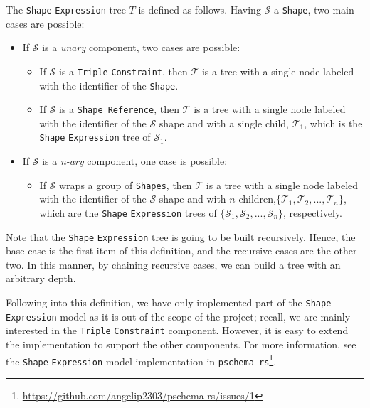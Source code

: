 \begin{definition}
    The \texttt{Shape} \texttt{Expression} tree $T$ is defined as follows. Having $\mathcal{S}$ a \texttt{Shape}, two main cases are possible:

    \begin{itemize}
        \itemsep0.5em
        \item If $\mathcal{S}$ is a \textit{unary} component, two cases are possible:
              \begin{itemize}
                  \itemsep0.25em
                  \item If $\mathcal{S}$ is a \texttt{Triple} \texttt{Constraint}, then $\mathcal{T}$ is a tree with a single node labeled with the identifier of the \texttt{Shape}.
                  \item If $\mathcal{S}$ is a \texttt{Shape Reference}, then $\mathcal{T}$ is a tree with a single node labeled with the identifier of the $\mathcal{S}$ shape and with a single child, $\mathcal{T}_1$, which is the \texttt{Shape} \texttt{Expression} tree of $\mathcal{S}_1$.
              \end{itemize}
        \item If $\mathcal{S}$ is a \textit{n-ary} component, one case is possible:
              \begin{itemize}
                  \itemsep0.25em
                  \item If $\mathcal{S}$ wraps a group of \texttt{Shapes}, then $\mathcal{T}$ is a tree with a single node labeled with the identifier of the $\mathcal{S}$ shape and with $n$ children,$\{\mathcal{T}_1, \mathcal{T}_2, ..., \mathcal{T}_n\}$, which are the \texttt{Shape} \texttt{Expression} trees of $\{\mathcal{S}_1, \mathcal{S}_2, ..., \mathcal{S}_n\}$, respectively.
              \end{itemize}
    \end{itemize}

    Note that the \texttt{Shape} \texttt{Expression} tree is going to be built recursively. Hence, the base case is the first item of this definition, and the recursive cases are the other two. In this manner, by chaining recursive cases, we can build a tree with an arbitrary depth.
\end{definition}

Following into this definition, we have only implemented part of the \texttt{Shape} \texttt{Expression} model as it is out of the scope of the project; recall, we are mainly interested in the \texttt{Triple} \texttt{Constraint} component. However, it is easy to extend the implementation to support the other components. For more information, see the \texttt{Shape} \texttt{Expression} model implementation in \texttt{pschema-rs}\footnote{\url{https://github.com/angelip2303/pschema-rs/issues/1}}.

